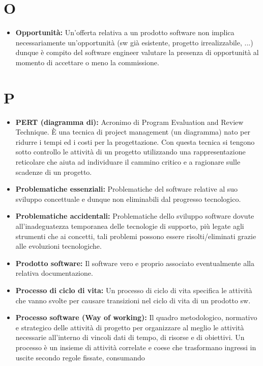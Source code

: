 \documentclass[a4paper]{article}
\begin{document}
	\section{O}
		\begin{itemize}	
			\item \textbf{Opportunità:} Un’offerta relativa a un prodotto software non implica necessariamente un’opportunità 
			(sw già esistente, progetto irrealizzabile, ...) dunque è compito del software engineer valutare la presenza di 
			opportunità al momento di accettare o meno la commissione.	
		\end{itemize}
		
	\section{P}
		\begin{itemize}
			\item \textbf{PERT (diagramma di):} Acronimo di Program Evaluation and Review Technique. È una tecnica di project management 
			(un diagramma) nato per ridurre i tempi ed i costi per la progettazione. Con questa tecnica si tengono sotto 
			controllo le attività di un progetto utilizzando una rappresentazione reticolare che aiuta ad individuare il 
			cammino critico e a ragionare sulle scadenze di un progetto.
			\item \textbf{Problematiche essenziali:} Problematiche del software relative al suo sviluppo concettuale e dunque 
			non eliminabili dal progresso tecnologico.
			\item \textbf{Problematiche accidentali:} Problematiche dello sviluppo software dovute all’inadeguatezza temporanea 
			delle tecnologie di supporto, più legate agli strumenti che ai concetti, tali problemi possono essere risolti/eliminati 
			grazie alle evoluzioni tecnologiche.
			\item \textbf{Prodotto software:} Il software vero e proprio associato eventualmente alla relativa documentazione.
			\item \textbf{Processo di ciclo di vita:} Un processo di ciclo di vita specifica le attività che vanno svolte per 
			causare transizioni nel ciclo di vita di un prodotto sw.
			\item \textbf{Processo software (Way of working):} Il quadro metodologico, normativo e strategico delle attività di 
			progetto per organizzare al meglio le attività necessarie all’interno di vincoli dati di tempo, di risorse e di obiettivi. 
			Un processo è un insieme di attività correlate e coese che trasformano ingressi in uscite secondo regole fissate, consumando 

\end{itemize}
\end{document}
